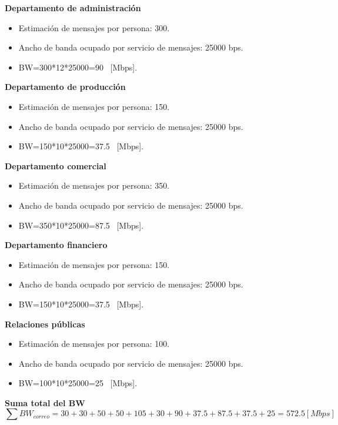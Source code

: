 \documentclass[12pt,letterpaper]{article}
\begin{document}
\textbf{Departamento de administración}
\begin{itemize}
    \item Estimación de mensajes por persona: 300. 
    \item Ancho de banda ocupado por servicio de mensajes: 25000 bps.
    \item BW=300*12*25000=90 \ [Mbps].
\end{itemize}
\textbf{Departamento de producción}
\begin{itemize}
    \item Estimación de mensajes por persona: 150. 
    \item Ancho de banda ocupado por servicio de mensajes: 25000 bps.
    \item BW=150*10*25000=37.5 \ [Mbps].
\end{itemize}
\textbf{Departamento comercial}
\begin{itemize}
    \item Estimación de mensajes por persona: 350. 
    \item Ancho de banda ocupado por servicio de mensajes: 25000 bps.
    \item BW=350*10*25000=87.5 \ [Mbps].
\end{itemize}
\textbf{Departamento financiero}
\begin{itemize}
    \item Estimación de mensajes por persona: 150. 
    \item Ancho de banda ocupado por servicio de mensajes: 25000 bps.
    \item BW=150*10*25000=37.5 \ [Mbps].
\end{itemize}
\textbf{Relaciones públicas}
\begin{itemize}
    \item Estimación de mensajes por persona: 100. 
    \item Ancho de banda ocupado por servicio de mensajes: 25000 bps.
    \item BW=100*10*25000=25 \ [Mbps].
\end{itemize}
\textbf{Suma total del BW}
\begin{equation}
    \sum BW_{correo}=30+30+50+50+105+30+90+37.5+87.5+37.5+25=572.5[Mbps]
\end{equation}

\newpage
\end{document}

